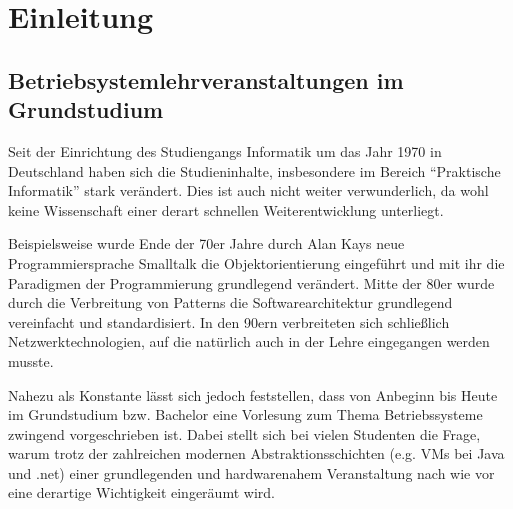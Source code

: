 \chapter{Einleitung}
\label{chap:introduction}


\section{Betriebsystemlehrveranstaltungen im Grundstudium}
\label{sec:motivation}

		Seit der Einrichtung des Studiengangs Informatik um das Jahr 1970 in Deutschland haben sich die Studieninhalte, insbesondere im Bereich "`Praktische Informatik"' stark verändert.
		Dies ist auch nicht weiter verwunderlich, da wohl keine Wissenschaft einer derart schnellen Weiterentwicklung unterliegt.

		Beispielsweise wurde Ende der 70er Jahre durch Alan Kays neue Programmiersprache Smalltalk die Objektorientierung eingeführt und mit ihr die Paradigmen der Programmierung grundlegend verändert.
		Mitte der 80er wurde durch die Verbreitung von Patterns die Softwarearchitektur grundlegend vereinfacht und standardisiert.
		In den 90ern verbreiteten sich schließlich Netzwerktechnologien, auf die natürlich auch in der Lehre eingegangen werden musste.

		Nahezu als Konstante lässt sich jedoch feststellen, dass von Anbeginn bis Heute im Grundstudium bzw. Bachelor eine Vorlesung zum Thema Betriebssysteme zwingend vorgeschrieben ist.
		Dabei stellt sich bei vielen Studenten die Frage, warum trotz der zahlreichen modernen Abstraktionsschichten (e.g. VMs bei Java und .net) einer grundlegenden und hardwarenahem Veranstaltung nach wie vor eine derartige Wichtigkeit eingeräumt wird.


